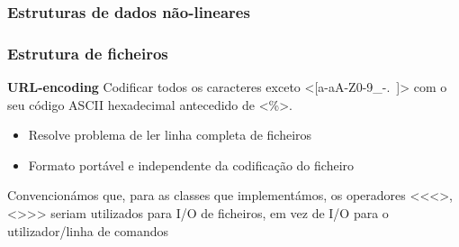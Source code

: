\documentclass{beamer}
\def\\{}
\def\texttt#1{<#1>}
\begin{document}
\begin{frame}
\frametitle{Estruturas de dados não-lineares}
\end{frame}

\begin{frame}
\frametitle{Estrutura de ficheiros}
\begin{center}
\begin{minipage}{0.37\textwidth}
	\footnotesize
\end{minipage}%
\begin{minipage}{0.63\textwidth}
\small
\textbf{URL-encoding}\\
Codificar todos os caracteres exceto \texttt{[a-aA-Z0-9\_-.~]} com o seu código ASCII hexadecimal antecedido de \texttt{\%}.
\begin{itemize}
	\item Resolve problema de ler linha completa de ficheiros
	\item Formato portável e independente da codificação do ficheiro
\end{itemize}
Convencionámos que, para as classes que implementámos, os operadores \texttt{<<}, \texttt{>>} seriam utilizados para I/O de ficheiros, em vez de I/O para o utilizador/linha de comandos
\begin{center}\begin{minipage}{0.93\textwidth}
	
\end{minipage} \end{center}
\end{minipage}
\end{center}
\end{frame}
\end{document}
